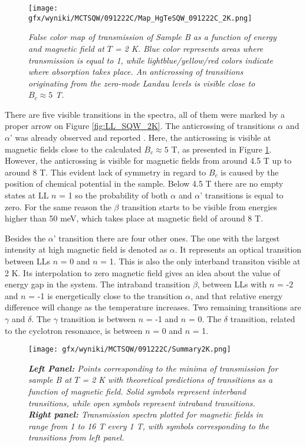 \documentclass[titlepage,a4paper]{book}
\begin{document}
\begin{figure}[ht]
	\centering
	\texttt{[image: gfx/wyniki/MCTSQW/091222C/Map\_HgTeSQW\_091222C\_2K.png]}
	\vspace{-10pt}
	\caption{\textit{False color map of transmission of Sample B as a function of energy and magnetic field at $T$ = 2 K. Blue color represents areas where transmission is equal to 1, while lightblue/yellow/red colors indicate where absorption takes place. An anticrossing of transitions originating from the zero-mode Landau levels is visible close to $B_c \approx 5$ T. }}
	\label{fig:Map_SQW_2K}
\end{figure}

There are five visible transitions in the spectra, all of them were marked by a proper arrow on Figure \ref{fig:LL_SQW_2K}. The anticrossing of transitions $\alpha$ and $\alpha$' was already observed and reported \cite{Orlita_MCT_QW}\cite{Zholudev_MCT_QW}\cite{Zholudev_MCT_QW_anticrossing}. Here, the anticrossing is visible at magnetic fields close to the calculated $B_c \approx 5$ T, as presented in Figure \ref{fig:Map_SQW_2K}. However, the anticrossing is visible for magnetic fields from around 4.5 T up to around 8 T. This evident lack of symmetry in regard to $B_c$ is caused by the position of chemical potential in the sample. Below 4.5 T there are no empty states at LL $n$ = 1 so the probability of both $\alpha$ and $\alpha$' transitions is equal to zero. For the same reason the $\beta$ transition starts to be visible from energies higher than 50 meV, which takes place at magnetic field of around 8 T.

Besides the $\alpha$' transition there are four other ones. The one with the largest intensity at high magnetic field is denoted as $\alpha$. It represents an optical transition between LLs $n$ = 0 and $n$ = 1. This is also the only interband transiton visible at 2 K. Its interpolation to zero magnetic field gives an idea about the value of energy gap in the system. The intraband transition $\beta$, between LLs with $n$ = -2 and $n$ = -1 is energetically close to the transition $\alpha$, and that relative energy difference will change as the temperature increases. Two remaining transitions are $\gamma$ and $\delta$. The $\gamma$ transition is between $n$ = -1 and $n$ = 0. The $\delta$ transition, related to the cyclotron resonance, is between $n$ = 0 and $n$ = 1.

\begin{figure}[ht]
	\centering
	\texttt{[image: gfx/wyniki/MCTSQW/091222C/Summary2K.png]}
	\vspace{-10pt}
	\caption{\textit{\textbf{Left Panel:} Points corresponding to the minima of transmission for sample B at $T$ = 2 K with theoretical predictions of transitions as a function of magnetic field. Solid symbols represent interband transitions, while open symbols represent intraband transitions. \textbf{Right panel:} Transmission spectra plotted for magnetic fields in range from 1 to 16 T every 1 T, with symbols corresponding to the transitions from left panel.}}
	\label{fig:Summary_SQW_2K}
\end{figure}
\end{document}

